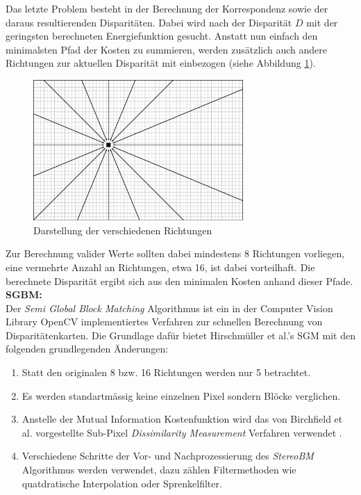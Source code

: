 \noindent
Das letzte Problem besteht in der Berechnung der Korrespondenz sowie der daraus resultierenden Disparitäten. Dabei wird nach der Disparität $D$ mit der geringsten berechneten Energiefunktion gesucht. Anstatt nun einfach den minimalsten Pfad der Kosten zu summieren, werden zusätzlich auch andere Richtungen zur aktuellen Disparität mit einbezogen (siehe Abbildung \ref{fig:sgm_directions}).

\begin{figure}[h]
	\begin{center}
		\includegraphics[width=8cm]{img/sgm_directions.pdf}
	\end{center}
	\caption{Darstellung der verschiedenen Richtungen}
	\label{fig:sgm_directions}
\end{figure}

\noindent
Zur Berechnung valider Werte sollten dabei mindestens 8 Richtungen vorliegen, eine vermehrte Anzahl an Richtungen, etwa 16, ist dabei vorteilhaft. Die berechnete Disparität ergibt sich aus den minimalen Kosten anhand dieser Pfade.\\

\noindent
\textbf{SGBM:} \\
Der \emph{Semi Global Block Matching} Algorithmus ist ein in der Computer Vision Library OpenCV implementiertes Verfahren zur schnellen Berechnung von Disparitätenkarten. Die Grundlage dafür bietet Hirschmüller et al.’s SGM \cite{hirschmueller2008sgm} mit den folgenden grundlegenden Änderungen:

\begin{enumerate}[label=C.\arabic*]
	\item Statt den originalen 8 bzw. 16 Richtungen werden nur 5 betrachtet. \label{item:differences_directions}
	\item Es werden  standartm\"assig keine einzelnen Pixel sondern Blöcke verglichen. \label{item:differences_matching}
	\item Anstelle der Mutual Information Kostenfunktion wird das von Birchfield et al. vorgestellte Sub-Pixel \emph{Dissimilarity Measurement} Verfahren verwendet \cite{birchfield-tomasi}.
	\item Verschiedene Schritte der Vor- und Nachprozessierung des \emph{StereoBM} Algorithmus werden verwendet, dazu zählen Filtermethoden wie quatdratische Interpolation oder Sprenkelfilter.
\end{enumerate}

